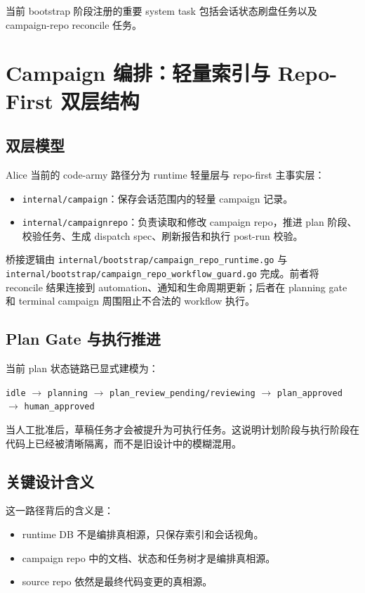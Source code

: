 \documentclass[12pt,a4paper]{ctexart}
\begin{document}
当前 bootstrap 阶段注册的重要 system task 包括会话状态刷盘任务以及 campaign-repo reconcile 任务。

\section{Campaign 编排：轻量索引与 Repo-First 双层结构}

\subsection{双层模型}

Alice 当前的 code-army 路径分为 runtime 轻量层与 repo-first 主事实层：

\begin{itemize}
  \item \texttt{internal/campaign}：保存会话范围内的轻量 campaign 记录。
  \item \texttt{internal/campaignrepo}：负责读取和修改 campaign repo，推进 plan 阶段、校验任务、生成 dispatch spec、刷新报告和执行 post-run 校验。
\end{itemize}

桥接逻辑由 \texttt{internal/bootstrap/campaign\_repo\_runtime.go} 与 \texttt{internal/bootstrap/campaign\_repo\_workflow\_guard.go} 完成。前者将 reconcile 结果连接到 automation、通知和生命周期更新；后者在 planning gate 和 terminal campaign 周围阻止不合法的 workflow 执行。

\subsection{Plan Gate 与执行推进}

当前 plan 状态链路已显式建模为：

\begin{center}
\texttt{idle} $\rightarrow$ \texttt{planning} $\rightarrow$ \texttt{plan\_review\_pending/reviewing} $\rightarrow$ \texttt{plan\_approved} $\rightarrow$ \texttt{human\_approved}
\end{center}

当人工批准后，草稿任务才会被提升为可执行任务。这说明计划阶段与执行阶段在代码上已经被清晰隔离，而不是旧设计中的模糊混用。

\subsection{关键设计含义}

这一路径背后的含义是：

\begin{itemize}
  \item runtime DB 不是编排真相源，只保存索引和会话视角。
  \item campaign repo 中的文档、状态和任务树才是编排真相源。
  \item source repo 依然是最终代码变更的真相源。
\end{itemize}
\end{document}
